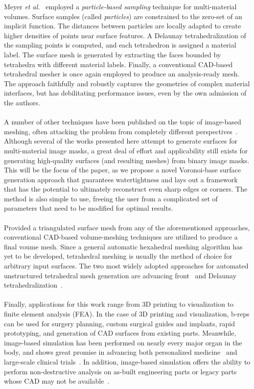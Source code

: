 %
Meyer \textit{et al.}~\cite{meyer_2008} employed a \textit{particle-based sampling} technique for multi-material volumes. Surface samples (called \textit{particles}) are constrained to the zero-set of an implicit function. The distances between particles are locally adapted to create higher densities of points near surface features. A Delaunay tetrahedralization of the sampling points is computed, and each tetrahedron is assigned a material label. The surface mesh is generated by extracting the faces bounded by tetrahedra with different material labels. Finally, a conventional CAD-based tetrahedral mesher is once again employed to produce an analysis-ready mesh. The approach faithfully and robustly captures the geometries of complex material interfaces, but has debilitating performance issues, even by the own admission of the authors. \\ \\
%
A number of other techniques have been published on the topic of image-based meshing, often attacking the problem from completely different perspectives~\cite{bronson_2014,fang_2009,boissonnat_2009,zhao_2016}. Although several of the works presented here attempt to generate surfaces for multi-material image masks, a great deal of effort and applicability still exists for generating high-quality surfaces (and resulting meshes) from binary image masks. This will be the focus of the paper, as we propose a novel Voronoi-base surface generation approach that guarantees watertightness and lays out a framework that has the potential to ultimately reconstruct even sharp edges or corners. The method is also simple to use, freeing the user from a complicated set of parameters that need to be modified for optimal results. \\ \\
%
Provided a triangulated surface mesh from any of the aforementioned approaches, conventional CAD-based volume-meshing techniques are utilized to produce a final voume mesh. Since a general automatic hexahedral meshing algorithm has yet to be developed, tetrahedral meshing is usually the method of choice for arbitrary input surfaces. The two most widely adopted approaches for automated unstructured tetrahedral mesh generation are advancing front~\cite{jin_1993, lohner_1988} and Delaunay tetrahedralization~\cite{lohner_1997}. \\ \\
%
Finally, applications for this work range from 3D printing to visualization to finite element analysis (FEA). In the case of 3D printing and visualization, b-reps can be used for surgery planning, custom surgical guides and implants, rapid prototyping, and generation of CAD surfaces from existing parts. Meanwhile, image-based simulation has been performed on nearly every major organ in the body, and shows great promise in advancing both personalized medicine~\cite{neal2010current} and large-scale clinical trials~\cite{viceconti2016silico}. In addition, image-based simulation offers the ability to perform non-destructive analysis on as-built engineering parts or legacy parts whose CAD may not be available~\cite{bradley2005advances}.\\ \\
